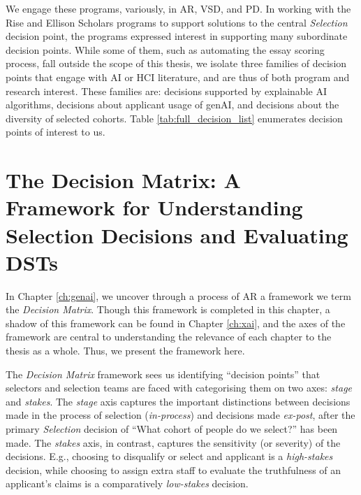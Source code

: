 We engage these programs, variously, in AR, VSD, and PD. In working with the Rise and Ellison Scholars programs to support solutions to the central \emph{Selection} decision point, the programs expressed interest in supporting many subordinate decision points. While some of them, such as automating the essay scoring process, fall outside the scope of this thesis, we isolate three families of decision points that engage with AI or HCI literature, and are thus of both program and research interest. These families are: decisions supported by explainable AI algorithms, decisions about applicant usage of genAI, and decisions about the diversity of selected cohorts. Table \ref{tab:full_decision_list} enumerates decision points of interest to us. 

\section{The Decision Matrix: A Framework for Understanding Selection Decisions and Evaluating DSTs}
In Chapter \ref{ch:genai}, we uncover through a process of AR a framework we term the \emph{Decision Matrix}. Though this framework is completed in this chapter, a shadow of this framework can be found in Chapter \ref{ch:xai}, and the axes of the framework are central to understanding the relevance of each chapter to the thesis as a whole. Thus, we present the framework here.

The \emph{Decision Matrix} framework sees us identifying ``decision points'' that selectors and selection teams are faced with categorising them on two axes: \emph{stage} and \emph{stakes}. The \emph{stage} axis captures the important distinctions between decisions made in the process of selection (\emph{in-process}) and decisions made \emph{ex-post}, after the primary \emph{Selection} decision of ``What cohort of people do we select?'' has been made. The \emph{stakes} axis, in contrast, captures the sensitivity (or severity) of the decisions. E.g., choosing to disqualify or select and applicant is a \emph{high-stakes} decision, while choosing to assign extra staff to evaluate the truthfulness of an applicant's claims is a comparatively \emph{low-stakes} decision.

